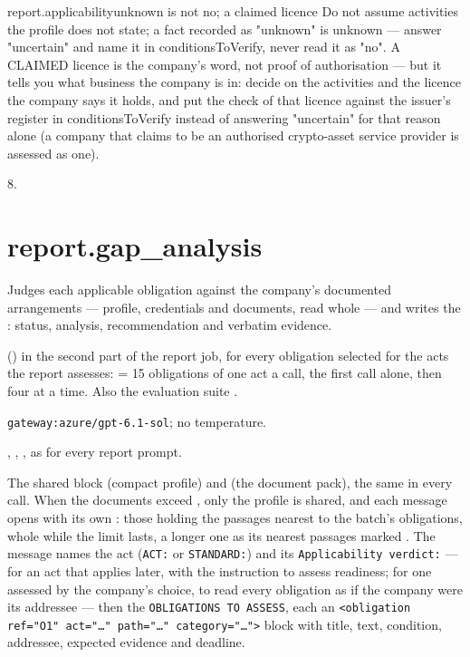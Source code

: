 \par\nopagebreak
\begin{promptexcerpt}{report.applicability}{unknown is not no; a claimed licence}
Do not assume activities the profile does not state; a fact recorded as
"unknown" is unknown — answer "uncertain" and name it in conditionsToVerify,
never read it as "no". A CLAIMED licence is the company's word, not proof of
authorisation — but it tells you what business the company is in: decide on
the activities and the licence the company says it holds, and put the check of
that licence against the issuer's register in conditionsToVerify instead of
answering "uncertain" for that reason alone (a company that claims to be an
authorised crypto-asset service provider is assessed as one).
\end{promptexcerpt}

 8.


\section{report.gap\_analysis}\label{sec:aprompts:report-gap_analysis}

 Judges each applicable obligation against the company's documented
arrangements --- profile, credentials and documents, read whole --- and writes the
: status, analysis, recommendation and verbatim evidence.

  () in the second
part of the report job, for every obligation selected for the acts the report assesses:
 = 15 obligations of one act a call, the first call alone, then four
at a time. Also the evaluation suite .

 \texttt{gateway:azure/gpt-6.1-sol}; no temperature.

 , , , as for every
report prompt.

 The shared block  (compact profile) and
 (the document pack), the same in every call. When the documents exceed
, only the profile is shared, and each message opens with its own
: those holding the passages nearest to the batch's obligations, whole while
the limit lasts, a longer one as its nearest passages marked . The message
names the act (\texttt{ACT:} or \texttt{STANDARD:}) and its \texttt{Applicability verdict:} --- for an
act that applies later, with the instruction to assess readiness; for one assessed by the
company's choice, to read every obligation as if the company were its addressee --- then the
\texttt{OBLIGATIONS TO ASSESS}, each an \texttt{<obligation ref="O1" act="…" path="…" category="…">}
block with title, text, condition, addressee, expected evidence and deadline.

